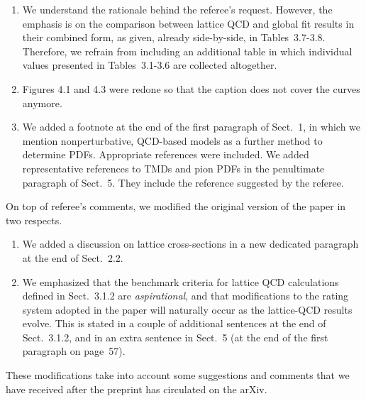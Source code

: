 \documentclass[11pt]{article}
\begin{document}
\begin{enumerate}
\item We understand the rationale behind the referee's request. However, the 
emphasis is on the comparison between lattice QCD and global fit results in 
their combined form, as given, already side-by-side, in Tables~3.7-3.8. 
Therefore, we refrain from including an additional table in which individual 
values presented in Tables~3.1-3.6 are collected altogether.

\item Figures 4.1 and 4.3 were redone so that the
caption does not cover the curves anymore.

\item We added a footnote at the end of the first paragraph of Sect.~1,
in which we mention nonperturbative, QCD-based models as a 
further method to determine PDFs. Appropriate references were included.
We added representative references to TMDs and pion PDFs in the 
penultimate paragraph of Sect.~5. They include the reference suggested by 
the referee.

\end{enumerate}

On top of referee's comments, we modified the original version
of the paper in two respects. 

\begin{enumerate}

\item We added a discussion on lattice cross-sections in a new dedicated
paragraph at the end of Sect.~2.2.

\item We emphasized that the benchmark criteria for lattice QCD 
calculations defined in Sect.~3.1.2 are {\it aspirational}, and that
modifications to the rating system adopted in the paper will naturally
occur as the lattice-QCD results evolve. This is stated in a couple of 
additional sentences at the end of Sect.~3.1.2, and in an extra sentence 
in Sect.~5 (at the end of the first paragraph on page~57).

\end{enumerate}

These modifications take into account some suggestions and comments that we
have received after the preprint has circulated on the arXiv.
\end{document}
